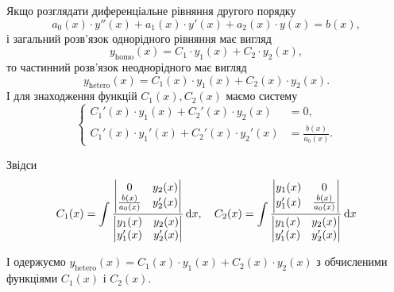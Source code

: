 Якщо розглядати диференціальне рівняння другого порядку
\begin{equation*}
	a_0(x) \cdot y''(x) + a_1(x) \cdot y'(x) + a_2(x) \cdot y(x) = b(x),
\end{equation*}
і загальний розв’язок однорідного рівняння має вигляд
\begin{equation*}
	y_{\text{homo}}(x) = C_1 \cdot y_1(x) + C_2 \cdot y_2(x),
\end{equation*}
то частинний розв’язок неоднорідного має вигляд 
\begin{equation*}
	y_{\text{hetero}}(x) = C_1(x) \cdot y_1(x) + C_2(x) \cdot y_2(x).
\end{equation*}
І для знаходження функцій $C_1(x), C_2(x)$ маємо систему
\begin{equation*}
	\left\{ \begin{aligned}
		C_1'(x) \cdot y_1(x) + C_2'(x) \cdot y_2(x) &= 0, \\
		C_1'(x) \cdot y_1'(x) + C_2'(x) \cdot y_2'(x) &= \frac{b(x)}{a_0(x)}.
	\end{aligned} \right.
\end{equation*}

Звідси
\begin{equation*}
	C_1(x) = \int \frac{\begin{vmatrix} 0 & y_2(x) \\ \frac{b(x)}{a_0(x)} & y_2'(x) \end{vmatrix}}{\begin{vmatrix} y_1(x) & y_2(x) \\ y_1'(x) & y_2'(x) \end{vmatrix}} \mathop{}\!\mathrm{d} x, \quad C_2(x) = \int \frac{\begin{vmatrix} y_1(x) & 0 \\ y_1'(x) & \frac{b(x)}{a_0(x)} \end{vmatrix}}{\begin{vmatrix} y_1(x) & y_2(x) \\ y_1'(x) & y_2'(x) \end{vmatrix}} \mathop{}\!\mathrm{d} x
\end{equation*}

І одержуємо $y_{\text{hetero}}(x) = C_1(x) \cdot y_1(x) + C_2(x) \cdot y_2(x)$ з обчисленими функціями $C_1(x)$ і $C_2(x)$.
